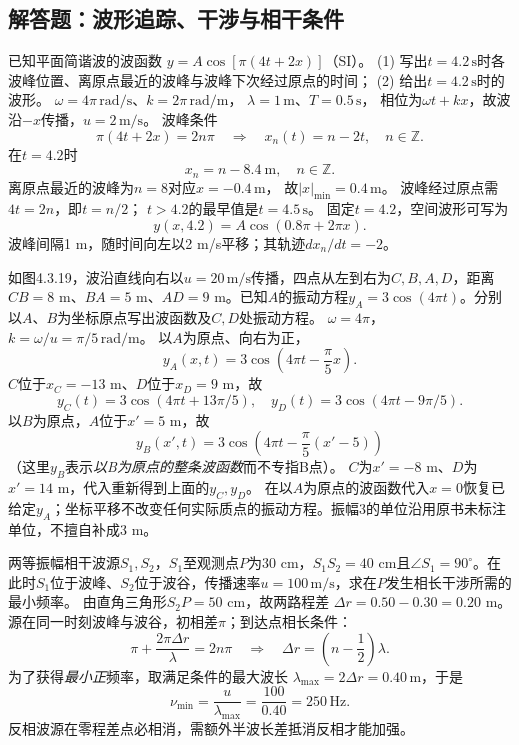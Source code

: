 \subsection{解答题：波形追踪、干涉与相干条件}

\problemtext 已知平面简谐波的波函数
$y=A\cos[\pi(4t+2x)]$（SI）。
(1) 写出$t=4.2\,\mathrm s$时各波峰位置、离原点最近的波峰与波峰下次经过原点的时间；
(2) 给出$t=4.2\,\mathrm s$时的波形。
\workings
$\omega=4\pi\,\mathrm{rad/s}$、$k=2\pi\,\mathrm{rad/m}$，
$\lambda=1\,\mathrm m$、$T=0.5\,\mathrm s$，
相位为$\omega t+kx$，故波沿$-x$传播，$u=2\,\mathrm{m/s}$。
波峰条件
\[
\pi(4t+2x)=2n\pi
\quad\Longrightarrow\quad
x_n(t)=n-2t,\quad n\in\mathbb Z.
\]
在$t=4.2$时
\[
\boxed{x_n=n-8.4\ \mathrm m,\quad n\in\mathbb Z}.
\]
离原点最近的波峰为$n=8$对应$x=-0.4\,\mathrm m$，
故$\boxed{|x|_{\min}=0.4\,\mathrm m}$。
波峰经过原点需$4t=2n$，即$t=n/2$；
$t>4.2$的最早值是$\boxed{t=4.5\,\mathrm s}$。
固定$t=4.2$，空间波形可写为
\[
\boxed{y(x,4.2)=A\cos(0.8\pi+2\pi x)}.
\]
\crosscheck 波峰间隔1 m，随时间向左以2 m/s平移；其轨迹$dx_n/dt=-2$。

\problemtext 如图4.3.19，波沿直线向右以$u=20\,\mathrm{m/s}$传播，四点从左到右为$C,B,A,D$，距离$CB=8$ m、$BA=5$ m、$AD=9$ m。已知$A$的振动方程$y_A=3\cos(4\pi t)$。分别以$A$、$B$为坐标原点写出波函数及$C,D$处振动方程。
\workings
$\omega=4\pi$，$k=\omega/u=\pi/5\,\mathrm{rad/m}$。
以$A$为原点、向右为正，
\[
\boxed{y_A(x,t)=3\cos\left(4\pi t-\frac\pi5x\right)}.
\]
$C$位于$x_C=-13$ m、$D$位于$x_D=9$ m，故
\[
\boxed{y_C(t)=3\cos(4\pi t+13\pi/5)},\quad
\boxed{y_D(t)=3\cos(4\pi t-9\pi/5)}.
\]
以$B$为原点，$A$位于$x'=5$ m，故
\[
\boxed{y_B(x',t)=3\cos\left(4\pi t-\frac\pi5(x'-5)\right)}
\]
（这里$y_B$表示\emph{以B为原点的整条波函数}而不专指B点）。
$C$为$x'=-8$ m、$D$为$x'=14$ m，代入重新得到上面的$y_C,y_D$。
\crosscheck 在以$A$为原点的波函数代入$x=0$恢复已给定$y_A$；坐标平移不改变任何实际质点的振动方程。振幅3的单位沿用原书未标注单位，不擅自补成3 m。

\problemtext 两等振幅相干波源$S_1,S_2$，$S_1$至观测点$P$为$30$ cm，$S_1S_2=40$ cm且$\angle S_1=90^\circ$。在此时$S_1$位于波峰、$S_2$位于波谷，传播速率$u=100\,\mathrm{m/s}$，求在$P$发生相长干涉所需的最小频率。
\workings
由直角三角形$S_2P=50$ cm，故两路程差
$\Delta r=0.50-0.30=0.20$ m。
源在同一时刻波峰与波谷，初相差$\pi$；到达点相长条件：
\[
\pi+\frac{2\pi\Delta r}{\lambda}=2n\pi
\quad\Longrightarrow\quad
\Delta r=\left(n-\frac12\right)\lambda.
\]
为了获得\emph{最小正}频率，取满足条件的最大波长
$\lambda_{\max}=2\Delta r=0.40\,\mathrm m$，于是
\[
\boxed{\nu_{\min}=\frac{u}{\lambda_{\max}}
=\frac{100}{0.40}=250\,\mathrm{Hz}}.
\]
\crosscheck 反相波源在零程差点必相消，需额外半波长差抵消反相才能加强。

